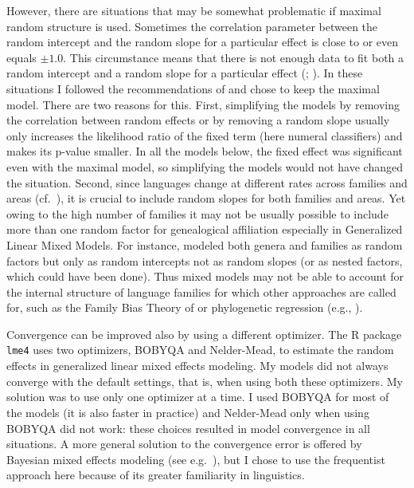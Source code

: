 \documentclass[output=collectionpaper]{langsci/langscibook}
\begin{document}
However, there are situations that may be somewhat problematic if maximal random structure is used. Sometimes the correlation parameter between the random intercept and the random slope for a particular effect is close to or even equals $\pm1.0$. This circumstance means that there is not enough data to fit both a random intercept and a random slope for a particular effect (\citealt{Baayen2008}; \citealt{Bates2015a}). In these situations I followed the recommendations of \citet{Barr2013} and chose to keep the maximal model. There are two reasons for this. First, simplifying the models by removing the correlation between random effects or by removing a random slope usually only increases the likelihood ratio of the fixed term (here numeral classifiers) and makes its p-value smaller. In all the models below, the fixed effect was significant even with the maximal model, so simplifying the models would not have changed the situation. Second, since languages change at different rates across families and areas (cf.\ \citealt{Nichols2003}), it is crucial to include random slopes for both families and areas. Yet owing to the high number of families it may not be usually possible to include more than one random factor for genealogical affiliation especially in Generalized Linear Mixed Models. For instance, \citet{Atkinson2011} modeled both genera and families as random factors but only as random intercepts not as random slopes (or as nested factors, which could have been done). Thus mixed models may not be able to account for the internal structure of language families for which other approaches are called for, such as the Family Bias Theory of \citet{Bickel2013b} or phylogenetic regression (e.g., \citealt{Dunn2011}).


Convergence can be improved also by using a different optimizer. The R package \texttt{lme4} \citep{Bates2015} uses two optimizers, BOBYQA and Nelder-Mead, to estimate the random effects in generalized linear mixed effects modeling. My models did not always converge with the default settings, that is, when using both these optimizers. My solution was to use only one optimizer at a time. I used BOBYQA for most of the models (it is also faster in practice) and Nelder-Mead only when using BOBYQA did not work: these choices resulted in model convergence in all situations. A more general solution to the convergence error is offered by Bayesian mixed effects modeling (see e.g.\ \citealt{Kimballsubmitted}), but I chose to use the frequentist approach here because of its greater familiarity in linguistics.
\end{document}
